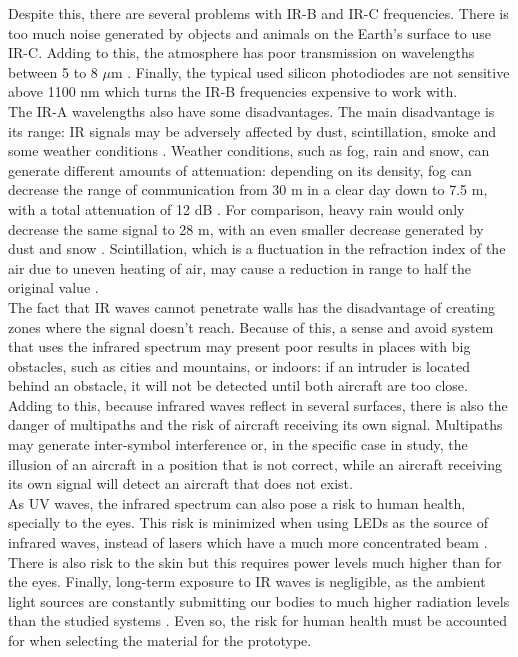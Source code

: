 Despite this, there are several problems with IR-B and IR-C frequencies. There is too much noise generated by objects and animals on the Earth's surface to use IR-C. Adding to this, the atmosphere has poor transmission on wavelengths between 5 to 8 $\mu$m \citep{Cox}. Finally, the typical used silicon photodiodes are not sensitive above 1100 nm \citep{Ryer.1998} which turns the IR-B frequencies expensive to work with.\\

The IR-A wavelengths also have some disadvantages. The main disadvantage is its range: IR signals may be adversely affected by dust, scintillation, smoke and some weather conditions \citep{Pauluzzi1992}. Weather conditions, such as fog, rain and snow, can generate different amounts of attenuation: depending on its density, fog can decrease the range of communication from 30 m in a clear day down to 7.5 m, with a total attenuation of 12 dB \citep{Pauluzzi1992}. For comparison, heavy rain would only decrease the same signal to 28 m, with an even smaller decrease generated by dust and snow \citep{Pauluzzi1992}. Scintillation, which is a fluctuation in the refraction index of the air due to uneven heating of air, may cause a reduction in range to half the original value \citep{Pauluzzi1992}.\\ 
The fact that IR waves cannot penetrate walls has the disadvantage of creating zones where the signal doesn't reach. Because of this, a sense and avoid system that uses the infrared spectrum may present poor results in places with big obstacles, such as cities and mountains, or indoors: if an intruder is located behind an obstacle, it will not be detected until both aircraft are too close. Adding to this, because infrared waves reflect in several surfaces, there is also the danger of multipaths and the risk of aircraft receiving its own signal. Multipaths may generate inter-symbol interference \citep{Ghassemlooy2006} or, in the specific case in study, the illusion of an aircraft in a position that is not correct, while an aircraft receiving its own signal will detect an aircraft that does not exist.\\ 
As UV waves, the infrared spectrum can also pose a risk to human health, specially to the eyes. This risk is minimized when using LEDs as the source of infrared waves, instead of lasers which have a much more concentrated beam \citep{Ghassemlooy2006}. There is also risk to the skin but this requires power levels much higher than for the eyes. Finally, long-term exposure to IR waves is negligible, as the ambient light sources are constantly submitting our bodies to much higher radiation levels than the studied systems \citep{Kahn1997}. Even so, the risk for human health must be accounted for when selecting the material for the prototype.\\

